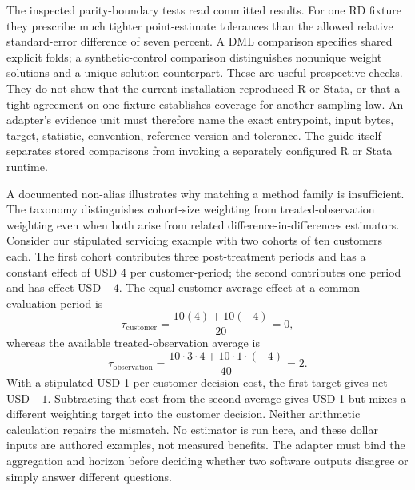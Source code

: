 The inspected parity-boundary tests read committed results. For one RD fixture
they prescribe much tighter point-estimate tolerances than the allowed relative
standard-error difference of seven percent. A DML comparison specifies shared
explicit folds; a synthetic-control comparison distinguishes nonunique weight
solutions and a unique-solution counterpart. These are useful prospective
checks. They do not show that the current installation reproduced R or Stata,
or that a tight agreement on one fixture establishes coverage for another
sampling law. An adapter's evidence unit must therefore name the exact entrypoint,
input bytes, target, statistic, convention, reference version and tolerance.
The guide itself separates stored comparisons from invoking a separately
configured R or Stata runtime.
\citep{exec23_statspai_contract}

A documented non-alias illustrates why matching a method family is insufficient.
The taxonomy distinguishes cohort-size weighting from treated-observation
weighting even when both arise from related difference-in-differences estimators.
Consider our stipulated servicing example with two cohorts of ten customers
each. The first cohort contributes three post-treatment periods and has a
constant effect of USD 4 per customer-period; the second contributes one period
and has effect USD $-4$. The equal-customer average effect at a common evaluation
period is
\[
 \tau_{\mathrm{customer}}=\frac{10(4)+10(-4)}{20}=0,
\]
whereas the available treated-observation average is
\[
 \tau_{\mathrm{observation}}=\frac{10\cdot3\cdot4+10\cdot1\cdot(-4)}{40}=2.
\]
With a stipulated USD 1 per-customer decision cost, the first target gives
net USD $-1$. Subtracting that cost from the second average gives USD 1 but
mixes a different weighting target into the customer decision. Neither
arithmetic calculation repairs the mismatch. No estimator is run here, and
these dollar inputs are authored examples, not measured benefits. The adapter
must bind the aggregation and horizon before deciding whether two software
outputs disagree or simply answer different questions.
\citep{exec23_statspai_contract,exec23_statspai_contract_reference}

